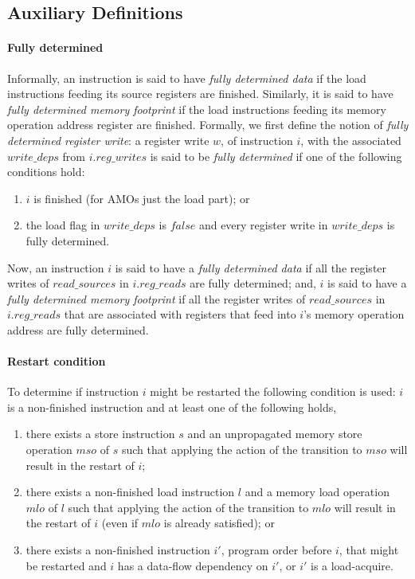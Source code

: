 \subsection{Auxiliary Definitions}\label{sec:omm:aux}
\paragraph{Fully determined}
Informally, an instruction is said to have {\it fully determined data} if the load instructions feeding its source registers are finished.
Similarly, it is said to have {\it fully determined memory footprint} if the load instructions feeding its memory operation address register are finished.
%
Formally, we first define the notion of {\it fully determined register write}: a register write $w$, of instruction $i$, with the associated $write\_deps$ from $i.reg\_writes$ is said to be {\it fully determined} if one of the following conditions hold:
\begin{enumerate}
\item $i$ is finished (for AMOs just the load part); or
\item the load flag in $write\_deps$ is $false$ and every register write in $write\_deps$ is fully determined.
\end{enumerate}
Now, an instruction $i$ is said to have a {\it fully determined data} if all the register writes of $read\_sources$ in $i.reg\_reads$ are fully determined;
and, $i$ is said to have a {\it fully determined memory footprint} if all the register writes of $read\_sources$ in $i.reg\_reads$ that are associated with registers that feed into $i$'s memory operation address are fully determined.


\paragraph{Restart condition}\label{omm:restart_condition}
To determine if instruction $i$ might be restarted the following condition is used: $i$ is a non-finished instruction and at least one of the following holds,
\begin{enumerate}
\item there exists a store instruction $s$ and an unpropagated memory store operation $mso$ of $s$ such that applying the action of the  transition to $mso$ will result in the restart of $i$;
\item there exists a non-finished load instruction $l$ and a memory load operation $mlo$ of $l$ such that applying the action of the  transition to $mlo$ will result in the restart of $i$ (even if $mlo$ is already satisfied); or
\item there exists a non-finished instruction $i'$, program order before $i$, that might be restarted and $i$ has a data-flow dependency on $i'$, or $i'$ is a load-acquire.
\end{enumerate}


